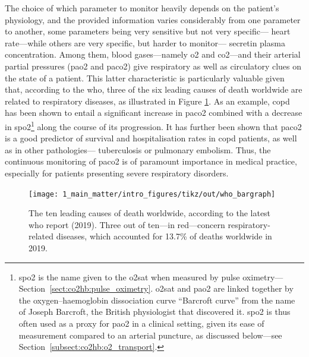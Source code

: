 
The choice of which parameter to monitor heavily depends on the patient's physiology, and the provided information varies considerably from one parameter to another, some parameters being very sensitive but not very specific---\eg{} heart rate---while others are very specific, but harder to monitor---\eg{} secretin plasma concentration. Among them, blood gases---namely \gls{o2} and \gls{co2}---and their arterial partial pressures (\gls{pao2} and \gls{paco2}) give respiratory as well as circulatory clues on the state of a patient\cite{wagner2015}. This latter characteristic is particularly valuable given that, according to the \gls{who}, three of the six leading causes of death worldwide are related to respiratory diseases, as illustrated in Figure \ref{fig:who_causes_death}. As an example, \gls{copd} has been shown to entail a significant increase in \gls{paco2} combined with a decrease in \gls{spo2}\footnote{\gls{spo2} is the name given to the \gls{o2sat} when measured by pulse oximetry---Section~\ref{sect:co2hb:pulse_oximetry}. \gls{o2sat} and \gls{pao2} are linked together by the oxygen–haemoglobin dissociation curve \aka{} \enquote{Barcroft curve} from the name of Joseph Barcroft, the British physiologist that discovered it\cite{barcroft1909}. \gls{spo2} is thus often used as a proxy for \gls{pao2} in a clinical setting, given its ease of measurement compared to an arterial puncture\cite{nitzan2014, jubran2015, tamura2019}, as discussed below---see Section~\ref{subsect:co2hb:o2_transport}.} along the course of its progression\cite{cukic2014, rajeh2016}. It has further been shown that \gls{paco2} is a good predictor of survival and hospitalisation rates in \gls{copd} patients\cite{nava1994, kessler1999, park2006}, as well as in other pathologies---\eg{} tuberculosis\cite{tsuboi2010} or pulmonary embolism\cite{ozsu2012}. Thus, the continuous monitoring of \gls{paco2} is of paramount importance in medical practice, especially for patients presenting severe respiratory disorders.

\begin{figure}
	\centering
	\texttt{[image: 1\_main\_matter/intro\_figures/tikz/out/who\_bargraph]}
	\caption[The ten leading causes of death according to the WHO.]{The ten leading causes of death worldwide, according to the latest \gls{who} report (2019)\cite{who_causes_death_2019}. Three out of ten---in red---concern respiratory-related diseases, which accounted for 13.7\% of deaths worldwide in 2019.}
	\label{fig:who_causes_death}
\end{figure}



